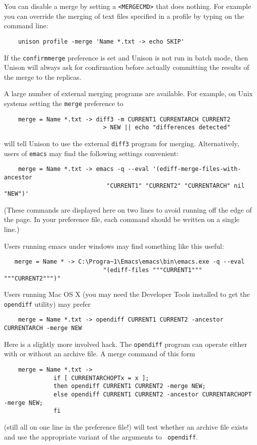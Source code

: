 \documentclass{article}
\begin{document}
You can disable a merge by setting a \verb|<MERGECMD>| that does nothing.  For
example you can override the merging of text files specified in a profile by
typing on the command line:
\begin{verbatim}
    unison profile -merge 'Name *.txt -> echo SKIP'
\end{verbatim}

If the \verb|confirmmerge| preference is set and Unison is not run in
batch mode, then Unison will always ask for confirmation before
actually committing the results of the merge to the replicas.

A large number of external merging programs are available.
For example, on Unix systems setting the \verb|merge| preference to
\begin{verbatim}
    merge = Name *.txt -> diff3 -m CURRENT1 CURRENTARCH CURRENT2
                            > NEW || echo "differences detected"
\end{verbatim}
\noindent
will tell Unison to use the external \verb|diff3| program for merging.
%
Alternatively, users of \verb|emacs| may find the following settings convenient:
\begin{verbatim}
    merge = Name *.txt -> emacs -q --eval '(ediff-merge-files-with-ancestor
                             "CURRENT1" "CURRENT2" "CURRENTARCH" nil "NEW")'
\end{verbatim}
\noindent
(These commands are displayed here on two lines to avoid running off the
edge of the page.  In your preference file, each command should be written on a
single line.)

Users running emacs under windows may find something like this useful:
\begin{verbatim}
   merge = Name * -> C:\Progra~1\Emacs\emacs\bin\emacs.exe -q --eval
                            "(ediff-files """CURRENT1""" """CURRENT2""")"
\end{verbatim}

Users running Mac OS X (you may need the Developer Tools installed to get
the {\tt opendiff} utility) may prefer
\begin{verbatim}
    merge = Name *.txt -> opendiff CURRENT1 CURRENT2 -ancestor CURRENTARCH -merge NEW
\end{verbatim}
Here is a slightly more involved hack.  The {\tt opendiff} program can
operate either with or without an archive file.  A merge command of this
form
\begin{verbatim}
    merge = Name *.txt ->
              if [ CURRENTARCHOPTx = x ];
              then opendiff CURRENT1 CURRENT2 -merge NEW;
              else opendiff CURRENT1 CURRENT2 -ancestor CURRENTARCHOPT -merge NEW;
              fi
\end{verbatim}
(still all on one line in the preference file!) will test whether an archive
file exists and use the appropriate variant of the arguments to {\tt
  opendiff}.
\end{document}
